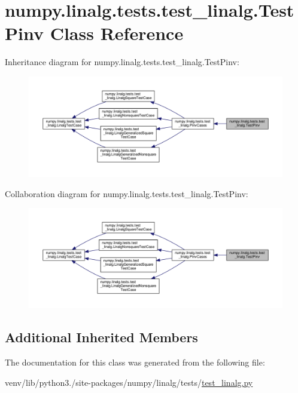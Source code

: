 \hypertarget{classnumpy_1_1linalg_1_1tests_1_1test__linalg_1_1TestPinv}{}\section{numpy.\+linalg.\+tests.\+test\+\_\+linalg.\+Test\+Pinv Class Reference}
\label{classnumpy_1_1linalg_1_1tests_1_1test__linalg_1_1TestPinv}


Inheritance diagram for numpy.\+linalg.\+tests.\+test\+\_\+linalg.\+Test\+Pinv\+:
\nopagebreak
\begin{figure}[H]
\begin{center}
\leavevmode
\includegraphics[width=350pt]{classnumpy_1_1linalg_1_1tests_1_1test__linalg_1_1TestPinv__inherit__graph}
\end{center}
\end{figure}


Collaboration diagram for numpy.\+linalg.\+tests.\+test\+\_\+linalg.\+Test\+Pinv\+:
\nopagebreak
\begin{figure}[H]
\begin{center}
\leavevmode
\includegraphics[width=350pt]{classnumpy_1_1linalg_1_1tests_1_1test__linalg_1_1TestPinv__coll__graph}
\end{center}
\end{figure}
\subsection*{Additional Inherited Members}


The documentation for this class was generated from the following file\+:\begin{DoxyCompactItemize}
\item 
venv/lib/python3./site-\/packages/numpy/linalg/tests/\hyperlink{test__linalg_8py}{test\+\_\+linalg.\+py}\end{DoxyCompactItemize}
